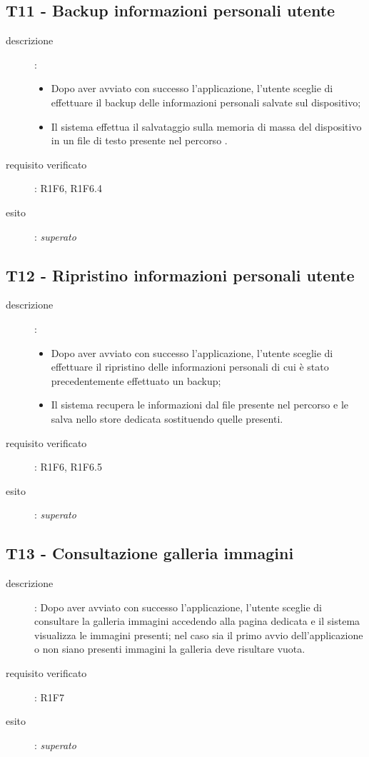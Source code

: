\subsection{T11 - Backup informazioni personali utente}
\begin{description}
\item[descrizione]: \hfill
	\begin{itemize}
	\item Dopo aver avviato con successo l'applicazione, l'utente sceglie di effettuare il backup delle informazioni personali salvate sul dispositivo;
	\item Il sistema effettua il salvataggio sulla memoria di massa del dispositivo in un file di testo presente nel percorso .
	\end{itemize}
\item[requisito verificato]: R1F6, R1F6.4
\item[esito]: \emph{superato}
\end{description}

\subsection{T12 - Ripristino informazioni personali utente}
\begin{description}
\item[descrizione]: \hfill
	\begin{itemize}
	\item Dopo aver avviato con successo l'applicazione, l'utente sceglie di effettuare il ripristino delle informazioni personali di cui è stato precedentemente effettuato un backup;
	\item Il sistema recupera le informazioni dal file presente nel percorso  e le salva nello store dedicata sostituendo quelle presenti.
	\end{itemize}
\item[requisito verificato]: R1F6, R1F6.5
\item[esito]: \emph{superato}
\end{description}

\subsection{T13 - Consultazione galleria immagini}
\begin{description}
\item[descrizione]: Dopo aver avviato con successo l'applicazione, l'utente sceglie di consultare la galleria immagini accedendo alla pagina dedicata e il sistema visualizza le immagini presenti; nel caso sia il primo avvio dell'applicazione o non siano presenti immagini la galleria deve risultare vuota.
\item[requisito verificato]: R1F7
\item[esito]: \emph{superato}
\end{description}

